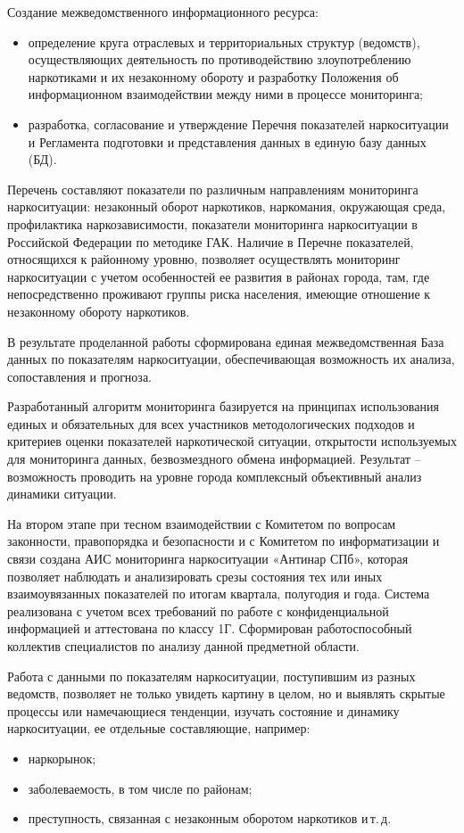 Создание межведомственного информационного ресурса:
\begin{itemize}
\item определение круга отраслевых и территориальных структур (ведомств),
осуществляющих деятельность по противодействию злоупотреблению наркотиками и их
незаконному обороту и  разработку Положения об информационном взаимодействии
между ними в процессе мониторинга;
\item разработка, согласование и утверждение Перечня показателей наркоситуации и
Регламента подготовки и представления данных в единую базу данных (БД). 
\end{itemize}
Перечень составляют показатели по различным направлениям мониторинга
наркоситуации: незаконный оборот наркотиков, наркомания, окружающая среда,
профилактика наркозависимости, показатели мониторинга наркоситуации в Российской
Федерации по методике ГАК. Наличие в Перечне показателей, относящихся к
районному уровню, позволяет осуществлять мониторинг наркоситуации с учетом
особенностей ее развития в районах города, там, где непосредственно проживают
группы риска населения, имеющие отношение к незаконному обороту наркотиков. 


В результате проделанной работы сформирована единая межведомственная База данных
по показателям наркоситуации, обеспечивающая возможность их анализа,
сопоставления и прогноза. 

Разработанный алгоритм мониторинга базируется на принципах использования единых
и обязательных для всех участников методологических подходов и критериев оценки
показателей наркотической ситуации, открытости используемых для мониторинга
данных, безвозмездного обмена информацией. Результат – возможность проводить на
уровне города комплексный объективный анализ динамики ситуации.

На втором этапе при тесном взаимодействии с Комитетом по вопросам законности,
правопорядка и безопасности и с Комитетом по информатизации и связи создана АИС
мониторинга наркоситуации «Антинар СПб», которая позволяет наблюдать и
анализировать срезы состояния тех или иных взаимоувязанных показателей по итогам
квартала, полугодия и года. Система реализована с учетом всех требований по
работе с конфиденциальной информацией и аттестована по классу 1Г. Сформирован
работоспособный коллектив специалистов по анализу данной предметной области.

Работа с данными по показателям наркоситуации, поступившим из разных ведомств,
позволяет не только увидеть картину в целом, но и выявлять скрытые процессы или
намечающиеся тенденции, изучать состояние и динамику наркоситуации, ее отдельные
составляющие, например:
\begin{itemize}
\item наркорынок; 
\item заболеваемость, в том числе по районам;
\item преступность, связанная с незаконным оборотом наркотиков и\,т.\,д.
\end{itemize}

